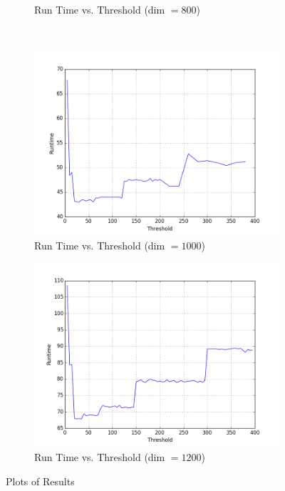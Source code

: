 \documentclass[12pt]{article}
\begin{document}
\begin{figure}
\begin{subfigure}{.5\textwidth}
  \caption{Run Time vs. Threshold (dim $= 800$)}
  \label{fig:sub2}
\end{subfigure} \\ %
\bigskip
\begin{subfigure}{.5\textwidth}
  \centering
  \includegraphics[width=\linewidth]{data/d1000.png}
  \caption{Run Time vs. Threshold (dim $= 1000$)}
  \label{fig:sub3}
\end{subfigure}%
\begin{subfigure}{.5\textwidth}
  \centering
  \includegraphics[width=\linewidth]{data/d1200.png}
  \caption{Run Time vs. Threshold (dim $= 1200$)}
  \label{fig:sub4}
\end{subfigure}%
\caption{Plots of Results}
\label{results}
\end{figure}
\end{document}
